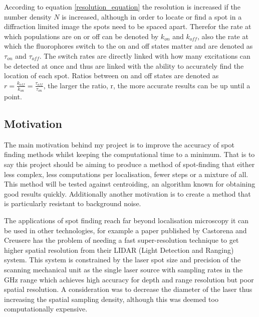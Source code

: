 \documentclass[aps,pra,a4paper,nofootinbib,onecolumn,tightenlines,longbibliography,12pt,amsfonts,amssymb,amsmath,floatfix]{revtex4-2} %
\begin{document}
   According to equation \ref{resolution_equation} the resolution is increased 
   if the number density $N$ is increased, although in order to locate or find a spot 
   in a diffraction limited image the spots need to be spaced apart. 
   Therefor the rate at which populations are on or off can be denoted by $k_{on}$ and 
   $k_{off}$, also the rate at which the fluorophores switch to the on and off states matter 
   and are denoted as $\tau_{on}$ and $\tau_{off}$. The switch rates are directly linked with 
   how many excitations can be detected at once and thus are linked with the ability to 
   accurately find the location of each spot. Ratios between on and off states are denoted as 
   $r=\frac{k_{off}}{k_{on}}=\frac{\tau_{off}}{\tau_{on}}$, the larger the ratio, r, the more 
   accurate results can be up until a point.
   

  \subsection{Motivation} %
  \label{sub:Motivation}
  

  The main motivation behind my project is to improve the accuracy of spot finding methods 
  whilst keeping the computational time to a minimum. That is to say this project should be aiming to
  produce a method of spot-finding that either less complex, less computations
  per localisation, fewer steps or a mixture of all. This method will be tested against 
  centroiding, an algorithm known for obtaining good results quickly. Additionally another
  motivation is to create a method that is particularly resistant to background noise. 

  The applications of spot finding reach far beyond localisation microscopy it 
  can be used in other technologies, for example a paper published by Castorena and Creusere \cite{6638050}
  has the problem of needing a fast super-resolution technique to get higher 
  spatial resolution from their LIDAR (Light Detection and Ranging) system. This system is constrained by the 
  laser spot size and precision of the scanning mechanical unit as the single laser 
  source with sampling rates in the GHz range which achieves high accuracy for depth 
  and range resolution but poor spatial resolution. A consideration was to decrease the 
  diameter of the laser thus increasing the spatial sampling density, although this 
  was deemed too computationally expensive.
  
\end{document}
